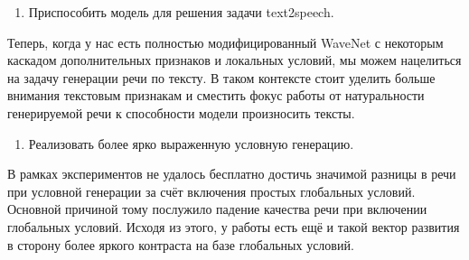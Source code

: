 \documentclass[../diploma.tex]{subfiles}
\begin{document}
\begin{enumerate}
    \item Приспособить модель для решения задачи text2speech.
\end{enumerate}
Теперь, когда у нас есть полностью модифицированный WaveNet с некоторым каскадом дополнительных признаков и локальных условий, мы можем нацелиться на задачу генерации речи по тексту. В таком контексте стоит уделить больше внимания текстовым признакам и сместить фокус работы от натуральности генерируемой речи к способности модели произносить тексты.

\begin{enumerate}[resume]
    \item Реализовать более ярко выраженную условную генерацию.
\end{enumerate}
В рамках экспериментов не удалось бесплатно достичь значимой разницы в речи при условной генерации за счёт включения простых глобальных условий. Основной причиной тому послужило падение качества речи при включении глобальных условий. Исходя из этого, у работы есть ещё и такой вектор развития в сторону более яркого контраста на базе глобальных условий.
\end{document}
